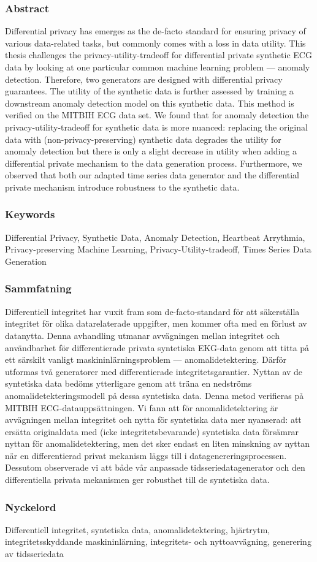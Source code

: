 \thispagestyle{empty}
\subsubsection*{Abstract}

Differential privacy has emerges as the de-facto standard for ensuring privacy of various data-related tasks, but commonly comes with a loss in data utility. This thesis challenges the privacy-utility-tradeoff for differential private synthetic ECG data by looking at one particular common machine learning problem --- anomaly detection. Therefore, two generators are designed with differential privacy guarantees. The utility of the synthetic data is further assessed by training a downstream anomaly detection model on this synthetic data. This method is verified on the MITBIH ECG data set. We found that for anomaly detection the privacy-utility-tradeoff for synthetic data is more nuanced: replacing the original data with (non-privacy-preserving) synthetic data degrades the utility for anomaly detection but there is only a slight decrease in utility when adding a differential private mechanism to the data generation process. Furthermore, we observed that both our adapted time series data generator and the differential private mechanism introduce robustness to the synthetic data.

\subsubsection*{Keywords}
Differential Privacy, Synthetic Data, Anomaly Detection, Heartbeat Arrythmia, Privacy-preserving Machine Learning, Privacy-Utility-tradeoff, Times Series Data Generation

\newpage

\subsubsection*{Sammfatning}
Differentiell integritet har vuxit fram som de-facto-standard för att säkerställa integritet för olika datarelaterade uppgifter, men kommer ofta med en förlust av datanytta. Denna avhandling utmanar avvägningen mellan integritet och användbarhet för differentierade privata syntetiska EKG-data genom att titta på ett särskilt vanligt maskininlärningsproblem --- anomalidetektering. Därför utformas två generatorer med differentierade integritetsgarantier. Nyttan av de syntetiska data bedöms ytterligare genom att träna en nedströms anomalidetekteringsmodell på dessa syntetiska data. Denna metod verifieras på MITBIH ECG-datauppsättningen. Vi fann att för anomalidetektering är avvägningen mellan integritet och nytta för syntetiska data mer nyanserad: att ersätta originaldata med (icke integritetsbevarande) syntetiska data försämrar nyttan för anomalidetektering, men det sker endast en liten minskning av nyttan när en differentierad privat mekanism läggs till i datagenereringsprocessen. Dessutom observerade vi att både vår anpassade tidsseriedatagenerator och den differentiella privata mekanismen ger robusthet till de syntetiska data.


\subsubsection*{Nyckelord}
Differentiell integritet, syntetiska data, anomalidetektering, hjärtrytm, integritetsskyddande maskininlärning, integritets- och nyttoavvägning, generering av tidsseriedata